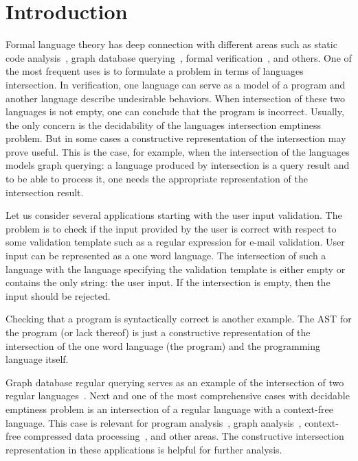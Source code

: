 \section{Introduction}

Formal language theory has deep connection with different areas such as static code analysis~\cite{Reps:1995:PID:199448.199462,vardoulakis2010cfa2,Yan:2011:DCA:2001420.2001440,rehof2001type,lu2013incremental, pratikakis2006existential, zhang2017context}, graph database querying~\cite{hellingsRelational, hellingsPathQuerying,zhang2016context, koschmieder2012regular}, formal verification~\cite{10.1007/11730637_17, 10.1007/3-540-63141-0_10}, and others.
One of the most frequent uses is to formulate a problem in terms of languages intersection.
In verification, one language can serve as a model of a program and another language describe undesirable behaviors.
When intersection of these two languages is not empty, one can conclude that the program is incorrect.
Usually, the only concern is the decidability of the languages intersection emptiness problem.
But in some cases a constructive representation of the intersection may prove useful.
This is the case, for example, when the intersection of the languages models graph querying: a language produced by intersection is a query result and to be able to process it, one needs the appropriate representation of the intersection result.

Let us consider several applications starting with the user input validation.
The problem is to check if the input provided by the user is correct with respect to some validation template such as a regular expression for e-mail validation.
User input can be represented as a one word language.
The intersection of such a language with the language specifying the validation template is either empty or contains the only string: the user input.
If the intersection is empty, then the input should be rejected.

Checking that a program is syntactically correct is another example.
The AST for the program (or lack thereof) is just a constructive representation of the intersection of the one word language (the program) and the programming language itself.

Graph database regular querying serves as an example of the intersection of two regular languages~\cite{ABITEBOUL1999428,koschmieder2012regular,alkhateeb:tel-00293206}.
Next and one of the most comprehensive cases with decidable emptiness problem is an intersection of a regular language with a context-free language.
This case is relevant for program analysis~\cite{Reps:1995:PID:199448.199462,vardoulakis2010cfa2,Yan:2011:DCA:2001420.2001440}, graph analysis~\cite{hellingsPathQuerying,zhang2016context,grigorev2016context}, context-free compressed data processing~\cite{MANETH201819}, and other areas.
The constructive intersection representation in these applications is helpful for further analysis.

